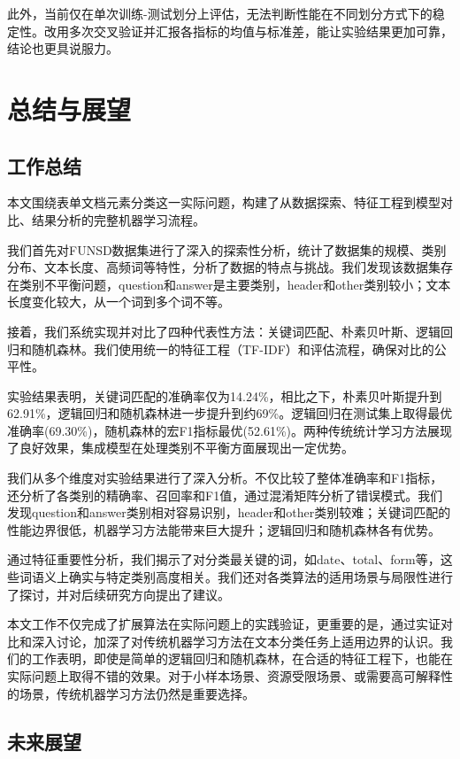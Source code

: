 \documentclass[12pt,a4paper]{article}
\begin{document}
此外，当前仅在单次训练-测试划分上评估，无法判断性能在不同划分方式下的稳定性。改用多次交叉验证并汇报各指标的均值与标准差，能让实验结果更加可靠，结论也更具说服力。

\section{总结与展望}

\subsection{工作总结}

本文围绕表单文档元素分类这一实际问题，构建了从数据探索、特征工程到模型对比、结果分析的完整机器学习流程。

我们首先对FUNSD数据集进行了深入的探索性分析，统计了数据集的规模、类别分布、文本长度、高频词等特性，分析了数据的特点与挑战。我们发现该数据集存在类别不平衡问题，question和answer是主要类别，header和other类别较小；文本长度变化较大，从一个词到多个词不等。

接着，我们系统实现并对比了四种代表性方法：关键词匹配、朴素贝叶斯、逻辑回归和随机森林。我们使用统一的特征工程（TF-IDF）和评估流程，确保对比的公平性。

实验结果表明，关键词匹配的准确率仅为14.24\%，相比之下，朴素贝叶斯提升到62.91\%，逻辑回归和随机森林进一步提升到约69\%。逻辑回归在测试集上取得最优准确率(69.30\%)，随机森林的宏F1指标最优(52.61\%)。两种传统统计学习方法展现了良好效果，集成模型在处理类别不平衡方面展现出一定优势。

我们从多个维度对实验结果进行了深入分析。不仅比较了整体准确率和F1指标，还分析了各类别的精确率、召回率和F1值，通过混淆矩阵分析了错误模式。我们发现question和answer类别相对容易识别，header和other类别较难；关键词匹配的性能边界很低，机器学习方法能带来巨大提升；逻辑回归和随机森林各有优势。

通过特征重要性分析，我们揭示了对分类最关键的词，如date、total、form等，这些词语义上确实与特定类别高度相关。我们还对各类算法的适用场景与局限性进行了探讨，并对后续研究方向提出了建议。

本文工作不仅完成了扩展算法在实际问题上的实践验证，更重要的是，通过实证对比和深入讨论，加深了对传统机器学习方法在文本分类任务上适用边界的认识。我们的工作表明，即使是简单的逻辑回归和随机森林，在合适的特征工程下，也能在实际问题上取得不错的效果。对于小样本场景、资源受限场景、或需要高可解释性的场景，传统机器学习方法仍然是重要选择。

\subsection{未来展望}
\end{document}
